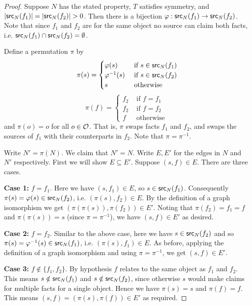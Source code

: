 \begin{proof}

Suppose $N$ has the stated property, $T$ satisfies symmetry, and $|\mathsf{src}_N(f_1)|
= |\mathsf{src}_N(f_2)| > 0$. Then there is a bijection $\varphi: \mathsf{src}_N(f_1) \to
\mathsf{src}_N(f_2)$. Note that since $f_1$ and $f_2$ are for the same object no source
can claim both facts, i.e. $\mathsf{src}_N(f_1) \cap \mathsf{src}_N(f_2) = \emptyset$.

Define a permutation $\pi$ by
\[
    \pi(s) = \begin{cases}
        \varphi(s) & \text{ if } s \in \mathsf{src}_N(f_1) \\
        \varphi^{-1}(s) & \text{ if } s \in \mathsf{src}_N(f_2) \\
        s & \text{ otherwise }
    \end{cases}
\]
\[
    \pi(f) = \begin{cases}
        f_2 & \text{ if } f = f_1 \\
        f_2 & \text{ if } f = f_2 \\
        f & \text{ otherwise }
    \end{cases}
\]
and $\pi(o) = o$ for all $o \in \mathcal{O}$. That is, $\pi$ swaps facts $f_1$ and
$f_2$, and swaps the sources of $f_1$ with their counterparts in $f_2$. Note
that $\pi = \pi^{-1}$.

Write $N' = \pi(N)$. We claim that $N' = N$. Write $E, E'$ for the edges
in $N$ and $N'$ respectively. First we will show $E \subseteq E'$. Suppose $(s,
f) \in E$. There are three cases.

\textbf{Case 1:} $f=f_1$. Here we have $(s, f_1) \in E$, so $s \in
\mathsf{src}_N(f_1)$. Consequently $\pi(s) = \varphi(s) \in \mathsf{src}_N(f_2)$, i.e. $(\pi(s),
f_2) \in E$. By the definition of a graph isomorphism we get $(\pi(\pi(s)),
\pi(f_2)) \in E'$. Noting that $\pi(f_2) = f_1 = f$ and $\pi(\pi(s)) = s$ (since
$\pi=\pi^{-1}$), we have $(s, f) \in E'$ as desired.

\textbf{Case 2:} $f = f_2$. Similar to the above case, here we have $s \in
\mathsf{src}_N(f_2)$ and so $\pi(s) = \varphi^{-1}(s) \in \mathsf{src}_N(f_1)$, i.e. $(\pi(s),
f_1) \in E$. As before, applying the definition of a graph isomorphism and
using $\pi=\pi^{-1}$, we get $(s, f) \in E'$.

\textbf{Case 3:} $f \notin \{f_1, f_2\}$. By hypothesis $f$ relates to the
same object as $f_1$ and $f_2$. This means $s \notin \mathsf{src}_N(f_1)$ and $s
\notin \mathsf{src}_N(f_2)$, since otherwise $s$ would make claims for multiple facts
for a single object. Hence we have $\pi(s)=s$ and $\pi(f)=f$. This means $(s,
f) = (\pi(s), \pi(f)) \in E'$ as required.


\end{proof}
